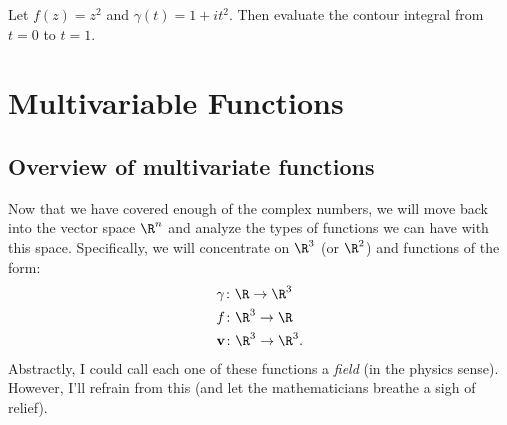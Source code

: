         \begin{exercise}
        Let $f(z)=z^2$ and $\gamma(t)=1+it^2$.  Then evaluate the contour integral from $t=0$ to $t=1$.
        \end{exercise}
        
        
        \chapter{Multivariable Functions}
        
        \section{Overview of multivariate functions}
        Now that we have covered enough of the complex numbers, we will move back into the vector space $\R^n$ and analyze the types of functions we can have with this space.  Specifically, we will concentrate on $\R^3$ (or $\R^2$) and functions of the form:
        \begin{align}
            &\gamma\colon \R \to \R^3\\
            &f\colon \R^3 \to \R\\
            &\mathbf{v}\colon \R^3 \to \R^3.
        \end{align}
        Abstractly, I could call each one of these functions a \emph{field} (in the physics sense).  However, I'll refrain from this (and let the mathematicians breathe a sigh of relief).
        
